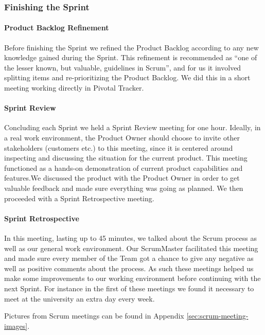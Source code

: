 \subsubsection{Finishing the Sprint}

\paragraph{Product Backlog Refinement}
Before finishing the Sprint we refined the Product Backlog according to any new knowledge gained during the Sprint. This refinement is recommended as ``one of the lesser known, but valuable, guidelines in Scrum''\cite{ScrumPrimer2}, and for us it involved splitting items and re-prioritizing the Product Backlog. We did this in a short meeting working directly in Pivotal Tracker.

\paragraph{Sprint Review}
Concluding each Sprint we held a Sprint Review meeting for one hour. Ideally, in a real work environment, the Product Owner should choose to invite other stakeholders (customers etc.) to this meeting, since it is centered around inspecting and discussing the situation for the current product. This meeting functioned as a hands-on demonstration of current product capabilities and features.We discussed the product with the Product Owner in order to get valuable feedback and made sure everything was going as planned. We then proceeded with a Sprint Retrospective meeting.

\paragraph{Sprint Retrospective}
In this meeting, lasting up to 45 minutes, we talked about the Scrum process as well as our general work environment. Our ScrumMaster facilitated this meeting and made sure every member of the Team got a chance to give any negative as well as positive comments about the process. As such these meetings helped us make some improvements to our working environment before continuing with the next Sprint. For instance in the first of these meetings we found it necessary to meet at the university an extra day every week.

Pictures from Scrum meetings can be found in Appendix \ref{sec:scrum-meeting-images}.